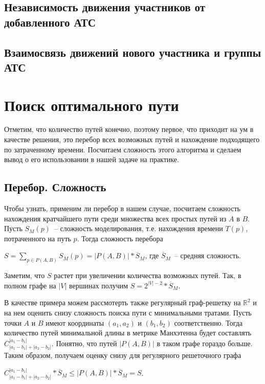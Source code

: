 \documentclass[12pt, a4paper]{article}
\begin{document}
	\subsection{Независимость движения участников от добавленного АТС}
	\subsection{Взаимосвязь движений нового участника и группы АТС}
	
	\fi
	\newpage
	\section{Поиск оптимального пути}
	
	Отметим, что количество путей конечно, поэтому первое, что приходит на ум в качестве решения, это перебор всех возможных путей и нахождение подходящего по затраченному времени. Посчитаем сложность этого алгоритма и сделаем вывод о его использовании в нашей задаче на практике.
	
	\subsection{Перебор. Сложность}
	Чтобы узнать, применим ли перебор в нашем случае, посчитаем сложность нахождения кратчайшего пути среди множества всех простых путей из $A$ в $B$. Пусть $S_M(p)$~-- сложность моделирования, т.е. нахождения времени $T(p)$, потраченного на путь $p$.
	Тогда сложность перебора
	\begin{center}
		$S = \sum\limits_{p \in P(A,B)} S_M(p) = \vert P(A,B) \vert * \overline S_M$, где $\overline S_M$~-- средняя сложность.
	\end{center}
	Заметим, что $ S $ растет при увеличении количества возможных путей. Так, в полном графе на $\vert V \vert$ вершинах получим $S = 2^{|V|-2} * \overline S_M$.
	
	В качестве примера можем рассмотерть также регулярный граф-решетку на $\mathbb {R}^2$ и на нем оценить снизу сложность поиска пути с минимальными тратами. Пусть точки $A$ и $B$ имеют координаты $(a_1, a_2)$ и $(b_1, b_2)$ соответственно. Тогда количество путей минимальной длины в метрике Манхэтенна будет составлять $C^{|a_1-b_1|}_{|a_1-b_1| + |a_2-b_2|}$. Понятно, что путей $|P(A,B)|$ в таком графе гораздо больше. Таким образом, получаем оценку снизу для регулярного решеточного графа
	
	\begin{center}
		$C^{|a_1-b_1|}_{|a_1-b_1| + |a_2-b_2|} * \overline S_M  \leq  \vert P(A,B) \vert * \overline S_M = S$.
	\end{center}
	
\end{document}
